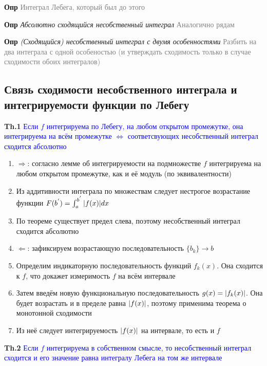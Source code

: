 \documentclass[a4paper, 14pt]{article}
\begin{document}
    \textbf{Опр}  \textcolor{gray}{Интеграл Лебега, который был до этого}
    
    \textbf{Опр} \textit{Абсолютно сходящийся несобственный интеграл} \textcolor{gray}{Аналогично рядам}
    
    \textbf{Опр} \textit{(Сходящийся) несобственный интеграл с двумя особенностями} \textcolor{gray}{Разбить на два
    интеграла с одной особеностью (и утверждать сходимость только в случае сходимости обоих интегралов)}
    
    \subsection{Связь сходимости несобственного интеграла и интегрируемости функции по Лебегу}
    
    \textbf{Th.1} \textcolor{blue}{Если $f$ интегрируема по Лебегу, на любом открытом промежутке, она
    интегрируема на всём промежутке $\Leftrightarrow$ соответсвующих несобственный интеграл сходится абсолютно}
    
    \begin{enumerate}
        \item $\Rightarrow$: согласно лемме об интегрируемости на подмножестве $f$ интегрируема на любом открытом
        промежутке, как и её модуль (по эквивалентности)
        \item Из аддитивности интеграла по множествам следует нестрогое возрастание функции $F(b^{'}) = \int_a^{b^{'}} \abs{f(x
            )} dx $
        \item По теореме существует предел слева, поэтому несобственный интеграл сходится абсолютно
        \item $\Leftarrow$: зафиксируем возрастающую последовательность $\{b_k\} \rightarrow b$
        \item Определим индикаторную последовательность функций $f_k(x)$.
        Она сходится к $f$, что докажет измеримость $f$ на всём интервале
        \item Затем введём новую функциональную последовательность $g(x) = \abs{f_k(x)}$.
        Она будет возрастать и в пределе равна $\abs{f(x)}$, поэтому применима теорема о монотонной сходимости
        \item Из неё следует интегрируемость $\abs{f(x)}$ на интервале, то есть и $f$
    \end{enumerate}
    
    \textbf{Th.2} \textcolor{blue}{Если $f$ интегрируема в собственном смысле, то несобственный интеграл сходится и
    его значение равна интегралу Лебега на том же интервале}
    
\end{document}
